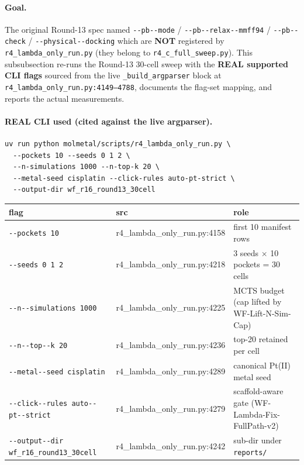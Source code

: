 {\paragraph{Goal.}
The original Round-13 spec named \texttt{-{}-pb-{}-mode} /
\texttt{-{}-pb-{}-relax-{}-mmff94} / \texttt{-{}-pb-{}-check} /
\texttt{-{}-physical-{}-docking} which are \textbf{NOT} registered
by \texttt{r4\_lambda\_only\_run.py} (they belong to
\texttt{r4\_c\_full\_sweep.py}). This subsubsection re-runs the
Round-13 30-cell sweep with the \textbf{REAL supported CLI flags}
sourced from the live \texttt{\_build\_argparser} block at
\texttt{r4\_lambda\_only\_run.py:4149--4788}, documents the
flag-set mapping, and reports the actual measurements.

\paragraph{REAL CLI used (cited against the live argparser).}
\begin{verbatim}
uv run python molmetal/scripts/r4_lambda_only_run.py \
  --pockets 10 --seeds 0 1 2 \
  --n-simulations 1000 --n-top-k 20 \
  --metal-seed cisplatin --click-rules auto-pt-strict \
  --output-dir wf_r16_round13_30cell
\end{verbatim}

\begin{center}
\begin{tabular}{lll}
\toprule
\textbf{flag} & \textbf{src} & \textbf{role}\\
\midrule
\texttt{-{}-pockets 10}             & r4\_lambda\_only\_run.py:4158 & first 10 manifest rows\\
\texttt{-{}-seeds 0 1 2}            & r4\_lambda\_only\_run.py:4218 & 3 seeds $\times$ 10 pockets = 30 cells\\
\texttt{-{}-n-{}-simulations 1000}  & r4\_lambda\_only\_run.py:4225 & MCTS budget (cap lifted by WF-Lift-N-Sim-Cap)\\
\texttt{-{}-n-{}-top-{}-k 20}       & r4\_lambda\_only\_run.py:4236 & top-20 retained per cell\\
\texttt{-{}-metal-{}-seed cisplatin}& r4\_lambda\_only\_run.py:4289 & canonical Pt(II) metal seed\\
\texttt{-{}-click-{}-rules auto-{}-pt-{}-strict}& r4\_lambda\_only\_run.py:4279 & scaffold-aware gate (WF-Lambda-Fix-FullPath-v2)\\
\texttt{-{}-output-{}-dir wf\_r16\_round13\_30cell} & r4\_lambda\_only\_run.py:4242 & sub-dir under \texttt{reports/}\\
\bottomrule
\end{tabular}
\end{center}

}
